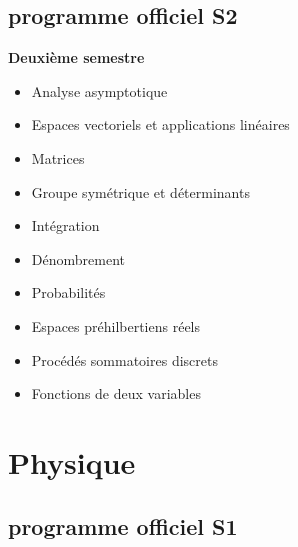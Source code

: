 \documentclass{beamer}
\begin{document}
\subsection{programme officiel S2}

\begin{frame}
    \textbf{Deuxième semestre}
    \begin{itemize}
        \item Analyse asymptotique
        \item Espaces vectoriels et applications linéaires
        \item Matrices
        \item Groupe symétrique et déterminants
        \item Intégration
        \item Dénombrement
        \item Probabilités
        \item Espaces préhilbertiens réels
        \item Procédés sommatoires discrets
        \item Fonctions de deux variables
    \end{itemize}
\end{frame}

\section{Physique}

\subsection{programme officiel S1}
\end{document}
